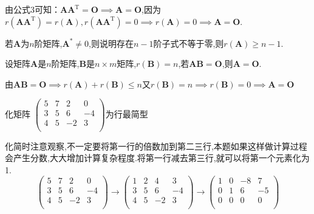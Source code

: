 由公式3可知：$\mathbf{A}\mathbf{A}^\mathrm{T}=\mathbf{O} \implies \mathbf{A}=\mathbf{O}$,因为$r(\mathbf{A}\mathbf{A}^\mathrm{T})=r(\mathbf{A}),r(\mathbf{A}\mathbf{A}^\mathrm{T})=0 \implies r(\mathbf{A})=0 \implies \mathbf{A}=\mathbf{O}$.

若$\mathbf{A}$为$n$阶矩阵,$\mathbf{A}^*\neq 0$,则说明存在$n-1$阶子式不等于零,则$r(\mathbf{A})\geqslant n-1$.

\begin{ttheorem}
    设矩阵$\mathbf{A}$是$n$阶矩阵,$\mathbf{B}$是$n\times m$矩阵,$r(\mathbf{B})=n$,若$\mathbf{A}\mathbf{B}=\mathbf{O}$,则$\mathbf{A}=\mathbf{O}$.

    \zheng 由$\mathbf{A}\mathbf{B}=\mathbf{O}\implies r(\mathbf{A})+r(\mathbf{B})\leqslant n$又$r(\mathbf{B})=n \implies r(\mathbf{B})=0 \implies \mathbf{A}=\mathbf{O}$
\end{ttheorem}

\begin{examp}{化矩阵
    $\begin{pmatrix}
    5   &   7   &   2   &   0   \\
    3   &   5   &   6   &   -4   \\
    4   &   5   &   -2   &   3   \\
    \end{pmatrix}$为行最简型}

    \jie 化简时注意观察,不一定要将第一行的倍数加到第二三行,本题如果这样做计算过程会产生分数,大大增加计算复杂程度.将第一行减去第三行,就可以将第一个元素化为1.
    \begin{equation*}
        \begin{pmatrix}
        5   &   7   &   2   &   0   \\
        3   &   5   &   6   &   -4   \\
        4   &   5   &   -2   &   3   \\
        \end{pmatrix}
    \rightarrow 
        \begin{pmatrix}
        1   &   2   &   4   &   3   \\
        3   &   5   &   6   &   -4   \\
        4   &   5   &   -2   &   3   \\
        \end{pmatrix}
    \rightarrow
        \begin{pmatrix}
        1   &   0   &   -8   &   7   \\
        0   &   1   &   6   &   -5   \\
        0   &   0   &   0   &   0   \\
        \end{pmatrix}
    \end{equation*}
\end{examp}

